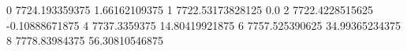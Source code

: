 0 7724.193359375 1.66162109375
1 7722.53173828125 0.0
2 7722.4228515625 -0.10888671875
4 7737.3359375 14.80419921875
6 7757.525390625 34.99365234375
8 7778.83984375 56.30810546875
